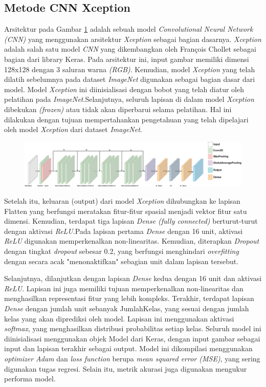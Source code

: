 \subsection{Metode CNN Xception}
Arsitektur pada Gambar \ref{fig:Xception} adalah sebuah model \textit{Convolutional Neural Network (\textit{CNN})} yang menggunakan arsitektur \textit{Xception} sebagai bagian dasarnya. \textit{Xception} adalah salah satu model \textit{CNN} yang dikembangkan oleh François Chollet sebagai bagian dari library Keras. Pada arsitektur ini, input gambar memiliki dimensi 128x128 dengan 3 saluran warna \textit{(RGB)}. Kemudian, model \textit{Xception} yang telah dilatih sebelumnya pada dataset \textit{ImageNet} digunakan sebagai bagian dasar dari model. Model \textit{Xception} ini diinisialisasi dengan bobot yang telah diatur oleh pelatihan pada \textit{ImageNet}.Selanjutnya, seluruh lapisan di dalam model \textit{Xception} dibekukan \textit{(frozen)} atau tidak akan diperbarui selama pelatihan. Hal ini dilakukan dengan tujuan mempertahankan pengetahuan yang telah dipelajari oleh model \textit{Xception} dari dataset \textit{ImageNet}.

\begin{figure}[hbt!]
	\includegraphics[width=1.0\linewidth]{gambar/bener//Arsitektur_CNNXception_Modifikasi.png}
	\label{fig:Xception}
\end{figure}
Setelah itu, keluaran (output) dari model \textit{Xception} dihubungkan ke lapisan Flatten yang berfungsi meratakan fitur-fitur spasial menjadi vektor fitur satu dimensi. Kemudian, terdapat tiga lapisan \textit{Dense (fully connected)} berturut-turut dengan aktivasi \textit{ReLU}.Pada lapisan pertama \textit{Dense} dengan 16 unit, aktivasi \textit{ReLU} digunakan memperkenalkan non-linearitas. Kemudian, diterapkan \textit{Dropout} dengan tingkat \textit{dropout} sebesar 0.2, yang berfungsi menghindari \textit{overfitting} dengan secara acak "menonaktifkan" sebagian unit dalam lapisan tersebut.

Selanjutnya, dilanjutkan dengan lapisan \textit{Dense} kedua dengan 16 unit dan aktivasi \textit{ReLU}. Lapisan ini juga memiliki tujuan memperkenalkan non-linearitas dan menghasilkan representasi fitur yang lebih kompleks. Terakhir, terdapat lapisan \textit{Dense} dengan jumlah unit sebanyak JumlahKelas, yang sesuai dengan jumlah kelas yang akan diprediksi oleh model. Lapisan ini menggunakan aktivasi \textit{softmax}, yang menghasilkan distribusi probabilitas setiap kelas. Seluruh model ini diinisialisasi menggunakan objek Model dari Keras, dengan input gambar sebagai input dan lapisan terakhir sebagai output. Model ini dikompilasi menggunakan \textit{optimizer Adam} dan \textit{loss function} berupa\textit{ mean squared error (MSE)}, yang sering digunakan tugas regresi. Selain itu, metrik akurasi juga digunakan mengukur performa model.

